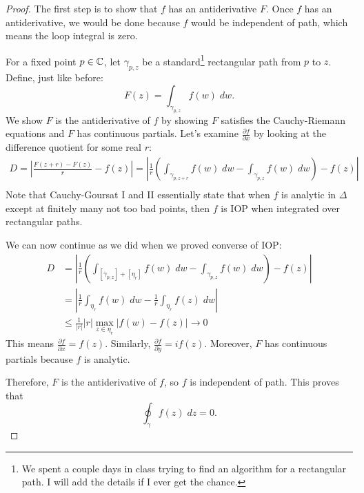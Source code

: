 \begin{proof}
    The first step is to show that $f$ has an antiderivative $F$.
    Once $f$ has an antiderivative, we would be done
    because $f$ would be independent of path, which means
    the loop integral is zero.

    \noindent
    For a fixed point $p \in \operatorname{\mathbb{C}}$, let $\gamma_{p, z}$ be a standard\footnote{We spent a couple days in class trying to
        find an algorithm for a rectangular path.
        I will add the details if I ever get the chance.
    }
    rectangular path from $p$ to $z$. 
    Define, just like before:
    \[ F(z) = \int_{\gamma_{p, z}} f(w) \; dw .\]
    We show $F$ is the antiderivative of $f$ by showing
    $F$ satisfies the Cauchy-Riemann equations and $F$ 
    has continuous partials.
    Let's examine $\frac{\partial f}{\partial x}$ by 
    looking at the difference quotient for some real $r$:
    \begin{align*}
        D = 
        \left| \frac{F(z+r) - F(z)}{r} - f(z)\right| =
        \left| \frac{1}{r}\left( \int_{\gamma_{p, z+r}} f(w) \; dw - 
        \int_{\gamma_{p, z}} f(w) \; dw \right)  - f(z) \right| \\
    \end{align*}
    Note that Cauchy-Goursat I and II essentially state that
    when $f$ is analytic in $\Delta$ except at finitely many
    not too bad points, then $f$ is IOP when integrated
    over rectangular paths.

    \noindent
    We can now continue as we did when we proved converse of IOP:
    \begin{align*}
        D &= \left| \frac{1}{r}\left( \int_{[\gamma_{p, z}] + [\eta_r]} f(w) \; dw - 
        \int_{\gamma_{p, z}} f(w) \; dw \right)  - f(z) \right| \tag{Independence of Path} \\
        &= \left| \frac{1}{r} \int_{\eta_r} f(w) \; dw - 
        \frac{1}{r} \int_{\eta_r} f(z) \; dw  \right| \tag{Concatenation of Paths} \\
        &\le \frac{1}{|r|} |r| \max_{z \in \eta_r} |f(w) - f(z)|
        \to 0 \tag{ML and Continuity of $f$}
    \end{align*}
    This means $\frac{\partial f}{\partial x} = f(z)$.
    Similarly, $\frac{\partial f}{\partial y} = if(z)$.
    Moreover, $F$ has continuous partials because $f$ is analytic.
    
    \noindent
    Therefore, $F$ is the antiderivative of $f$, so
    $f$ is independent of path.
    This proves that
    \[ \oint_{\gamma} f(z) \; dz = 0. \]
\end{proof}






